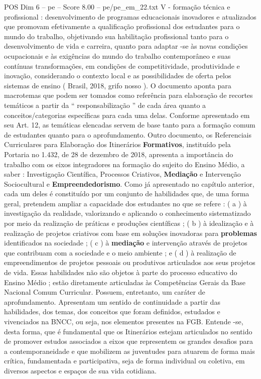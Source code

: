 \begin{textsample}{POS Dim 6 – pe – Score 8.00 – pe/pe\_em\_22.txt}
V - formação técnica e profissional : desenvolvimento de programas educacionais inovadores e atualizados que promovam efetivamente a qualificação profissional dos estudantes para o mundo do trabalho, objetivando sua habilitação profissional tanto para o desenvolvimento de vida e carreira, quanto para adaptar -se às novas condições ocupacionais e às exigências do mundo do trabalho contemporâneo e suas contínuas transformações, em condições de competitividade, produtividade e inovação, considerando o contexto local e as possibilidades de oferta pelos sistemas de ensino ( Brasil, 2018, grifo nosso ).
O documento aponta para macrotemas que podem ser tomados como referência para elaboração de recortes temáticos a partir da “ responsabilização ” de cada área quanto a conceitos/categorias específicas para cada uma delas.
Conforme apresentado em seu Art. 12, as temáticas elencadas servem de base tanto para a formação comum de estudantes quanto para o aprofundamento.
Outro documento, os Referenciais Curriculares para Elaboração dos Itinerários \textbf{Formativos}, instituído pela Portaria no 1.432, de 28 de dezembro de 2018, apresenta a importância do trabalho com os eixos integradores na formação do sujeito do Ensino Médio, a saber : Investigação Científica, Processos Criativos, \textbf{Mediação} e Intervenção Sociocultural e \textbf{Empreendedorismo}.
Como já apresentado no capítulo anterior, cada um deles é constituído por um conjunto de habilidades que, de uma forma geral, pretendem ampliar a capacidade dos estudantes no que se refere : ( a ) à investigação da realidade, valorizando e aplicando o conhecimento sistematizado por meio da realização de práticas e produções científicas ; ( b ) à idealização e à realização de projetos criativos com base em soluções inovadoras para \textbf{problemas} identificados na sociedade ; ( c ) à \textbf{mediação} e intervenção através de projetos que contribuam com a sociedade e o meio ambiente ; e ( d ) à realização de empreendimentos de projetos pessoais ou produtivos articulados aos seus projetos de vida.
Essas habilidades não são objetos à parte do processo educativo do Ensino Médio ; estão diretamente articuladas às Competências Gerais da Base Nacional Comum Curricular.
Possuem, entretanto, um caráter de aprofundamento.
Apresentam um sentido de continuidade a partir das habilidades, dos temas, dos conceitos que foram definidos, estudados e vivenciados na BNCC, ou seja, nos elementos presentes na FGB.
Entende -se, desta forma, que é fundamental que os Itinerários estejam articulados no sentido de promover estudos associados a eixos que representem os grandes desafios para a contemporaneidade e que mobilizem as juventudes para atuarem de forma mais crítica, fundamentada e participativa, seja de forma individual ou coletiva, em diversos aspectos e espaços de sua vida cotidiana.

\end{textsample}
